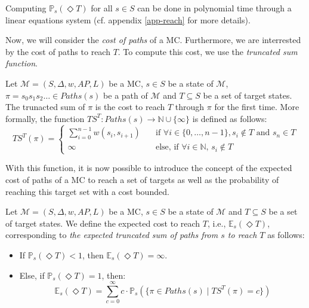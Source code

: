 \begin{theorem}
Computing $\mathbb{P}_s(\Diamond T)$ for all $s \in S$ can be done in polynomial
time through a linear equations system (cf. appendix \ref{app-reach} for more details).
\end{theorem}


Now, we will consider the \textit{cost of paths} of a MC. Furthermore, we
are interrested by the cost of paths to reach $T$. To compute this cost, we use the \textit{truncated sum function}.

\begin{definition}
  Let $\mathcal{M}=(S, \Delta, w, AP, L)$ be a MC, $s \in S$ be a state of $\mathcal{M}$, $\pi = s_0s_1s_2\dots \in Paths(s)$ be a path of $\mathcal{M}$ and $T \subseteq S$ be a set of target states.
  The trunacted sum of $\pi$ is the cost to reach $T$ through $\pi$
  for the first time. More formally, the function $TS^T: Paths(s) \rightarrow \mathbb{N} \cup \{\infty\}$ is defined as follows:
	\[
		TS^T(\pi) =
		\begin{cases}
			\sum_{i = 0}^{n-1} w(s_i, s_{i+1}) & \quad \text{if } \forall i \in \{0, \dots, n - 1\}, s_i \not\in T \text{ and } s_n \in T \\
			\infty & \quad \text{else, if } \forall i \in \mathbb{N}, \, s_i \notin T
		\end{cases}
	\]
\end{definition}
With this function, it is now possible to introduce the concept of the
expected cost of paths of a MC to reach a set of targets as well as
the probability of reaching this target set with a cost bounded.

\begin{definition}
	Let $\mathcal{M} = (S, \Delta, w, AP, L)$ be a MC, $s \in S$ be a state of $\mathcal{M}$ and $T \subseteq S$ be a set of target states. We define the expected cost to reach $T$, i.e., $\mathbb{E}_s(\Diamond T)$, corresponding to \textit{the expected truncated sum of paths from $s$ to reach $T$} as follows:
	\begin{itemize}
	\renewcommand{\labelitemi}{\tiny$\bullet$}
	\item If $\mathbb{P}_s(\Diamond T) < 1$, then $\mathbb{E}_s(\Diamond T) = \infty$.%
	\item Else, if $\mathbb{P}_s(\Diamond T) = 1$, then:
	\[
    \mathbb{E}_s(\Diamond T) = \sum_{c = 0}^\infty c \cdot \mathbb{P}_s(\{\pi \in Paths(s) \; | \; TS^T(\pi) = c \})
  \]
	\end{itemize}
\end{definition}

